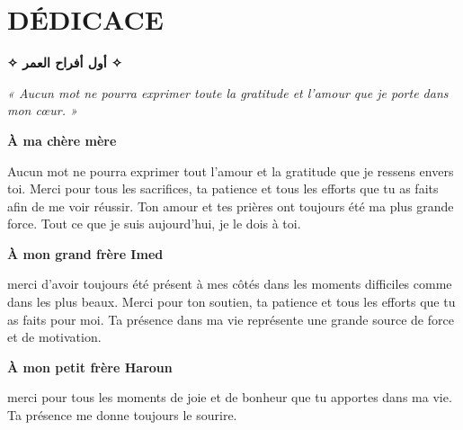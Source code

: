 \chapter*{\centering \Huge \textbf{DÉDICACE}}

\vspace{0.5cm}

\begin{center}
	{\LARGE\bfseries \textarabic{✧ أول أفراح العمر ✧}}
\end{center}

\vspace{0.8cm}

\begin{center}
	\large\itshape
	« Aucun mot ne pourra exprimer toute la gratitude et l’amour que je porte dans mon cœur. »
\end{center}

\vspace{1cm}

\begin{center}
	\textbf{\large À ma chère mère}
\end{center}

Aucun mot ne pourra exprimer tout l’amour et la gratitude que je ressens envers toi. Merci pour tous les sacrifices, ta patience et tous les efforts que tu as faits afin de me voir réussir. Ton amour et tes prières ont toujours été ma plus grande force. Tout ce que je suis aujourd’hui, je le dois à toi.
\vspace{0.7cm}

\begin{center}
	\textbf{\large À mon grand frère Imed}
\end{center}

merci d’avoir toujours été présent à mes côtés dans les moments difficiles comme dans les plus beaux. Merci pour ton soutien, ta patience et tous les efforts que tu as faits pour moi. Ta présence dans ma vie représente une grande source de force et de motivation.


\vspace{0.7cm}

\begin{center}
	\textbf{\large À mon petit frère Haroun}
\end{center}

merci pour tous les moments de joie et de bonheur que tu apportes dans ma vie. Ta présence me donne toujours le sourire.

\vspace{0.7cm}

